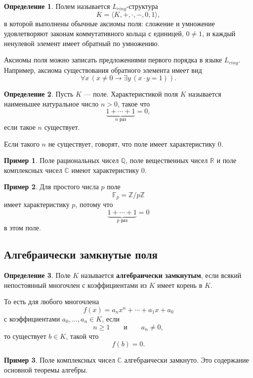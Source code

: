 \documentclass[12pt,a4paper,oneside,openany]{book}
\theoremstyle{definition}
\newtheorem{definition}{Определение}[chapter]
\newtheorem{example}{Пример}[chapter]
\theoremstyle{plain}
\theoremstyle{remark}
\begin{document}
\begin{definition}
Полем называется $L_{ring}$-структура
\[
K=\langle K,+,\cdot,-,0,1\rangle,
\]
в которой выполнены обычные аксиомы поля:
сложение и умножение удовлетворяют законам коммутативного кольца с единицей, $0\ne 1$, и каждый ненулевой элемент имеет обратный по умножению.
\end{definition}

Аксиомы поля можно записать предложениями первого порядка в языке $L_{ring}$. Например, аксиома существования обратного элемента имеет вид
\[
\forall x\,(x\ne 0\to \exists y\,(x\cdot y=1)).
\]

\begin{definition}
Пусть $K$ — поле. Характеристикой поля $K$ называется наименьшее натуральное число $n>0$, такое что
\[
\underbrace{1+\cdots+1}_{n\text{ раз}}=0,
\]
если такое $n$ существует.

Если такого $n$ не существует, говорят, что поле имеет характеристику $0$.
\end{definition}

\begin{example}
Поле рациональных чисел $\mathbb Q$, поле вещественных чисел $\mathbb R$ и поле комплексных чисел $\mathbb C$ имеют характеристику $0$.
\end{example}

\begin{example}
Для простого числа $p$ поле
\[
\mathbb F_p=\mathbb Z/p\mathbb Z
\]
имеет характеристику $p$, потому что
\[
\underbrace{1+\cdots+1}_{p\text{ раз}}=0
\]
в этом поле.
\end{example}

\subsection{Алгебраически замкнутые поля}

\begin{definition}
Поле $K$ называется \textbf{алгебраически замкнутым}, если всякий непостоянный многочлен с коэффициентами из $K$ имеет корень в $K$.
\end{definition}

То есть для любого многочлена
\[
f(x)=a_nx^n+\cdots+a_1x+a_0
\]
с коэффициентами $a_0,\ldots,a_n\in K$, если
\[
n\ge 1
\qquad\text{и}\qquad
a_n\ne 0,
\]
то существует $b\in K$, такой что
\[
f(b)=0.
\]

\begin{example}
Поле комплексных чисел $\mathbb C$ алгебраически замкнуто. Это содержание основной теоремы алгебры.
\end{example}
\end{document}
